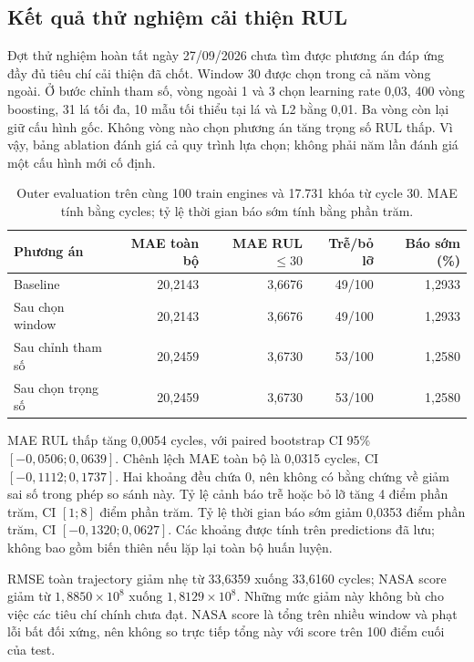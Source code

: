 \subsection{Kết quả thử nghiệm cải thiện RUL}
\label{sec:rul-improvement-results}

Đợt thử nghiệm hoàn tất ngày 27/09/2026 chưa tìm được phương án đáp ứng đầy đủ
tiêu chí cải thiện đã chốt. Window 30 được chọn trong cả năm vòng ngoài.
Ở bước chỉnh tham số, vòng ngoài 1 và 3 chọn learning rate 0,03, 400 vòng
boosting, 31 lá tối đa, 10 mẫu tối thiểu tại lá và L2 bằng 0,01. Ba vòng còn
lại giữ cấu hình gốc. Không vòng nào chọn phương án tăng trọng số RUL thấp.
Vì vậy, bảng ablation đánh giá cả quy trình lựa chọn; không phải năm lần
đánh giá một cấu hình mới cố định.

\begin{table}[H]
\centering\small
\caption{Outer evaluation trên cùng 100 train engines và 17.731 khóa từ cycle 30. MAE tính bằng cycles; tỷ lệ thời gian báo sớm tính bằng phần trăm.}
\label{tab:rul-improvement-outer}
\begin{tabular}{L{4.3cm}rrrr}
\toprule
Phương án & MAE toàn bộ & MAE RUL $\leq30$ & Trễ/bỏ lỡ & Báo sớm (\%)\\
\midrule
Baseline & 20,2143 & 3,6676 & 49/100 & 1,2933\\
Sau chọn window & 20,2143 & 3,6676 & 49/100 & 1,2933\\
Sau chỉnh tham số & 20,2459 & 3,6730 & 53/100 & 1,2580\\
Sau chọn trọng số & 20,2459 & 3,6730 & 53/100 & 1,2580\\
\bottomrule
\end{tabular}
\end{table}

MAE RUL thấp tăng 0,0054 cycles, với paired bootstrap CI 95\%
$[-0{,}0506;0{,}0639]$. Chênh lệch MAE toàn bộ là 0,0315 cycles,
CI $[-0{,}1112;0{,}1737]$. Hai khoảng đều chứa 0, nên không có bằng chứng
về giảm sai số trong phép so sánh này. Tỷ lệ cảnh báo trễ hoặc bỏ lỡ tăng
4 điểm phần trăm, CI $[1;8]$ điểm phần trăm. Tỷ lệ thời gian báo sớm giảm
0,0353 điểm phần trăm, CI $[-0{,}1320;0{,}0627]$. Các khoảng được tính trên
predictions đã lưu; không bao gồm biến thiên nếu lặp lại toàn bộ huấn luyện.

RMSE toàn trajectory giảm nhẹ từ 33,6359 xuống 33,6160 cycles; NASA score
giảm từ $1{,}8850\times10^8$ xuống $1{,}8129\times10^8$. Những mức giảm này
không bù cho việc các tiêu chí chính chưa đạt. NASA score là tổng trên nhiều
window và phạt lỗi bất đối xứng, nên không so trực tiếp tổng này với score
trên 100 điểm cuối của test.

